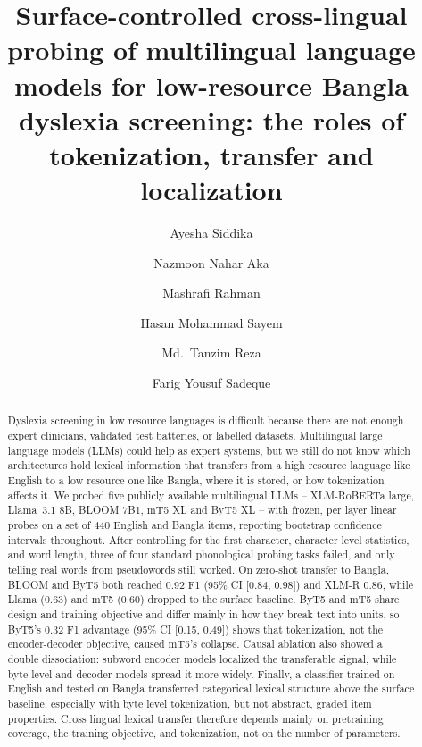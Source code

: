\documentclass[preprint,12pt,authoryear]{elsarticle}
\begin{document}
\begin{frontmatter}

\title{Surface-controlled cross-lingual probing of multilingual language models for low-resource Bangla dyslexia screening: the roles of tokenization, transfer and localization}

\author[bracu]{Ayesha Siddika}
\author[bracu]{Nazmoon Nahar Aka}
\author[bracu]{Mashrafi Rahman}
\author[bracu]{Hasan Mohammad Sayem}
\author[bracu]{Md.\ Tanzim Reza}
\author[bracu]{Farig Yousuf Sadeque}



\begin{abstract}
Dyslexia screening in low resource languages is difficult because there are not enough expert clinicians, validated test batteries, or labelled datasets. Multilingual large language models (LLMs) could help as expert systems, but we still do not know which architectures hold lexical information that transfers from a high resource language like English to a low resource one like Bangla, where it is stored, or how tokenization affects it. We probed five publicly available multilingual LLMs -- XLM-RoBERTa large, Llama~3.1 8B, BLOOM 7B1, mT5 XL and ByT5 XL -- with frozen, per layer linear probes on a set of 440 English and Bangla items, reporting bootstrap confidence intervals throughout. After controlling for the first character, character level statistics, and word length, three of four standard phonological probing tasks failed, and only telling real words from pseudowords still worked. On zero-shot transfer to Bangla, BLOOM and ByT5 both reached 0.92 F1 (95\% CI [0.84, 0.98]) and XLM-R 0.86, while Llama (0.63) and mT5 (0.60) dropped to the surface baseline. ByT5 and mT5 share design and training objective and differ mainly in how they break text into units, so ByT5's 0.32 F1 advantage (95\% CI [0.15, 0.49]) shows that tokenization, not the encoder-decoder objective, caused mT5's collapse. Causal ablation also showed a double dissociation: subword encoder models localized the transferable signal, while byte level and decoder models spread it more widely. Finally, a classifier trained on English and tested on Bangla transferred categorical lexical structure above the surface baseline, especially with byte level tokenization, but not abstract, graded item properties. Cross lingual lexical transfer therefore depends mainly on pretraining coverage, the training objective, and tokenization, not on the number of parameters.
\end{abstract}


\end{frontmatter}
\end{document}
